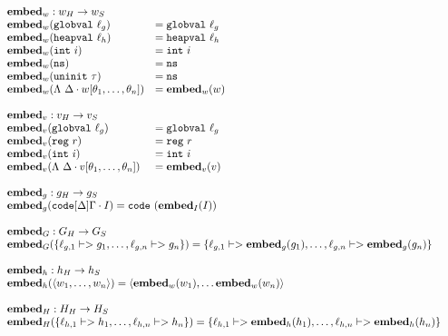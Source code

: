 {\footnotesize
\[\begin{array}{l}
\begin{array}{ll}
\rlap{$\embed_w : \high w -> \simple{w}$} \\
\embed_w(\mathtt{globval}\ \ell_g) &= \mathtt{globval}\ \ell_g \\
\embed_w(\mathtt{heapval}\ \ell_h) &= \mathtt{heapval}\ \ell_h \\
\embed_w(\mathtt{int}\ i) &= \mathtt{int}\ i \\
\embed_w(\mathtt{ns}) &= \mathtt{ns} \\
\embed_w(\mathtt{uninit}\ \tau) &= \mathtt{ns} \\
\embed_w(\Lambda\ \Delta \cdot w[\theta_1, \dots, \theta_n]) &= \embed_w(w) \\\\

\rlap{$\embed_v : \high v -> \simple{v}$} \\
\embed_v(\mathtt{globval}\ \ell_g) &= \mathtt{globval}\ \ell_g \\
\embed_v(\mathtt{reg}\ r) &= \mathtt{reg}\ r \\
\embed_v(\mathtt{int}\ i) &= \mathtt{int}\ i \\
\embed_v(\Lambda\ \Delta \cdot v[\theta_1, \dots, \theta_n]) &= \embed_v(v)
\end{array} \\\\

\begin{array}{l}
\embed_g : \high g -> \simple{g} \\
\embed_g(\mathtt{code}[\Delta]\Gamma \cdot I) = \mathtt{code}\ (\embed_I(I)) \\\\

\embed_G : \high G -> \simple{G} \\
\embed_G(\{\ell_{g,1} |-> g_1, \dots, \ell_{g,n} |-> g_n\}) = \{\ell_{g,1} |-> \embed_g(g_1), \dots, \ell_{g,n} |-> \embed_g(g_n)\} \\\\

\embed_h : \high h -> \simple{h} \\
\embed_h(\langle w_1, \dots, w_n \rangle) = \langle \embed_w(w_1), \dots \embed_w(w_n)\rangle \\\\

\embed_H : \high H -> \simple{H} \\
\embed_H(\{\ell_{h,1} |-> h_1, \dots, \ell_{h,n} |-> h_n\}) = \{\ell_{h,1} |-> \embed_h(h_1), \dots, \ell_{h,n} |-> \embed_h(h_n)\}
\end{array} \\\\


\end{array}\]}
